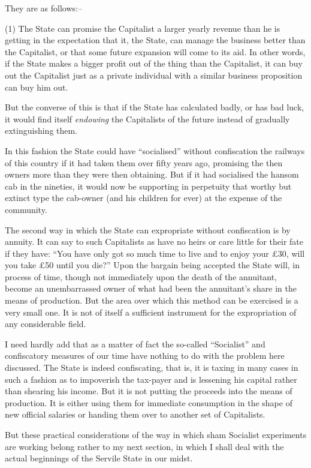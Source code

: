 \documentclass{book}
\begin{document}
They are as follows:–

(1) The State can promise the Capitalist a larger yearly revenue than he is getting in the expectation that it, the State, can manage the business better than the Capitalist, or that some future expansion will come to its aid. In other words, if the State makes a bigger profit out of the thing than the Capitalist, it can buy out the Capitalist just as a private individual with a similar business proposition can buy him out.

But the converse of this is that if the State has calculated badly, or has bad luck, it would find itself \emph{endowing} the Capitalists of the future instead of gradually extinguishing them.

In this fashion the State could have “socialised” without confiscation the railways of this country if it had taken them over fifty years ago, promising the then owners more than they were then obtaining. But if it had socialised the hansom cab in the nineties, it would now be supporting in perpetuity that worthy but extinct type the cab-owner (and his children for ever) at the expense of the community.

The second way in which the State can expropriate without confiscation is by annuity. It can say to such Capitalists as have no heirs or care little for their fate if they have: “You have only got so much time to live and to enjoy your £30, will you take £50 until you die?” Upon the bargain being accepted the State will, in process of time, though not immediately upon the death of the annuitant, become an unembarrassed owner of what had been the annuitant’s share in the means of production. But the area over which this method can be exercised is a very small one. It is not of itself a sufficient instrument for the expropriation of any considerable field.

I need hardly add that as a matter of fact the so-called “Socialist” and confiscatory measures of our time have nothing to do with the problem here discussed. The State is indeed confiscating, that is, it is taxing in many cases in such a fashion as to impoverish the tax-payer and is lessening his capital rather than shearing his income. But it is not putting the proceeds into the means of production. It is either using them for immediate consumption in the shape of new official salaries or handing them over to another set of Capitalists.\footnotemark[4]

But these practical considerations of the way in which sham Socialist experiments are working belong rather to my next section, in which I shall deal with the actual beginnings of the Servile State in our midst.
\end{document}
